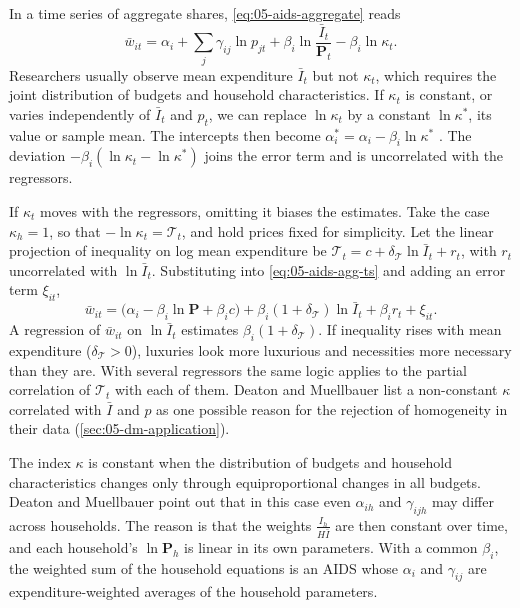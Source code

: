 In a time series of aggregate shares, \eqref{eq:05-aids-aggregate} reads
\begin{equation}\label{eq:05-aids-agg-ts}
  \bar w_{it} = \alpha_i + \sum_j\gamma_{ij}\ln p_{jt} + \beta_i\ln\frac{\bar I_t}{\mathbf{P}_t}
                - \beta_i\ln\kappa_t .
\end{equation}
Researchers usually observe mean expenditure $\bar I_t$ but not $\kappa_t$, which requires the joint
distribution of budgets and household characteristics. If $\kappa_t$ is constant, or varies independently
of $\bar I_t$ and $p_t$, we can replace $\ln\kappa_t$ by a constant $\ln\kappa^*$, its value or sample
mean. The intercepts then become $\alpha_i^* = \alpha_i - \beta_i\ln\kappa^*$
\citep[p.~315]{DeatonMuellbauer1980a}. The deviation $-\beta_i(\ln\kappa_t - \ln\kappa^*)$ joins the
error term and is uncorrelated with the regressors.

If $\kappa_t$ moves with the regressors, omitting it biases the estimates. Take the case $\kappa_h = 1$,
so that $-\ln\kappa_t = \mathcal{T}_t$, and hold prices fixed for simplicity. Let the linear projection of
inequality on log mean expenditure be $\mathcal{T}_t = c + \delta_{\mathcal{T}}\ln\bar I_t + r_t$, with
$r_t$ uncorrelated with $\ln\bar I_t$. Substituting into \eqref{eq:05-aids-agg-ts} and adding an error
term $\xi_{it}$,
\begin{equation*}
  \bar w_{it} = \bigl(\alpha_i - \beta_i\ln\mathbf{P} + \beta_i c\bigr)
               + \beta_i(1 + \delta_{\mathcal{T}})\ln\bar I_t + \beta_i r_t + \xi_{it}.
\end{equation*}
A regression of $\bar w_{it}$ on $\ln\bar I_t$ estimates $\beta_i(1 + \delta_{\mathcal{T}})$. If
inequality rises with mean expenditure ($\delta_{\mathcal{T}} > 0$), luxuries look more luxurious and
necessities more necessary than they are. With several regressors the same logic applies to the partial
correlation of $\mathcal{T}_t$ with each of them. Deaton and Muellbauer list a non-constant $\kappa$
correlated with $\bar I$ and $p$ as one possible reason for the rejection of homogeneity in their data
(\cref{sec:05-dm-application}).

The index $\kappa$ is constant when the distribution of budgets and household characteristics changes
only through equiproportional changes in all budgets. Deaton and Muellbauer point out that in this case
even $\alpha_{ih}$ and $\gamma_{ijh}$ may differ across households. The reason is that the weights
$\frac{I_h}{H\bar I}$ are then constant over time, and each household's $\ln\mathbf{P}_h$ is linear in its
own parameters. With a common $\beta_i$, the weighted sum of the household equations is an AIDS whose
$\alpha_i$ and $\gamma_{ij}$ are expenditure-weighted averages of the household parameters.


